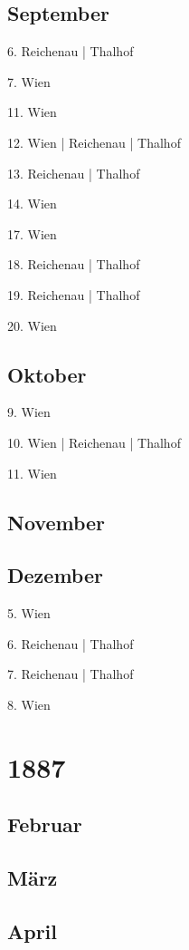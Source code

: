 \documentclass[twoside=false,titlepage=false,open=any, parskip=never, fontsize=10pt, headings=small, chapterprefix=false, appendixprefix=false, DIV=15]{scrbook}
\begin{document}
\begin{multicols}{3}
            \section*{September}
            6. Reichenau | Thalhof\par
            7. Wien\par
            11. Wien\par
            12. Wien | Reichenau | Thalhof\par
            13. Reichenau | Thalhof\par
            14. Wien\par
            17. Wien\par
            18. Reichenau | Thalhof\par
            19. Reichenau | Thalhof\par
            20. Wien\par
            \section*{Oktober}
            9. Wien\par
            10. Wien | Reichenau | Thalhof\par
            11. Wien\par
            \section*{November}
            \section*{Dezember}
            5. Wien\par
            6. Reichenau | Thalhof\par
            7. Reichenau | Thalhof\par
            8. Wien\par
            \chapter*{1887}
            \section*{Februar}
            \section*{März}
            \section*{April}

\end{multicols}
\end{document}
